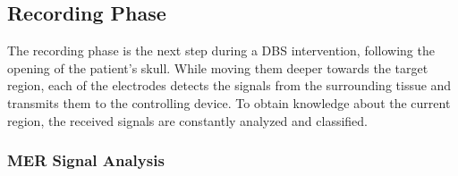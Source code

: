 \documentclass{vgtc}                          %
\begin{document}
\subsection{Recording Phase}\label{sec:overview:recording}
The recording phase is the next step during a DBS intervention, following the opening of the patient's skull. While moving them deeper towards the target region, each of the electrodes detects the signals from the surrounding tissue and transmits them to the controlling device. To obtain knowledge about the current region, the received signals are constantly analyzed and classified.

\subsubsection{MER Signal Analysis}\label{sec:overview:recording:signalanalysis}

\end{document}
